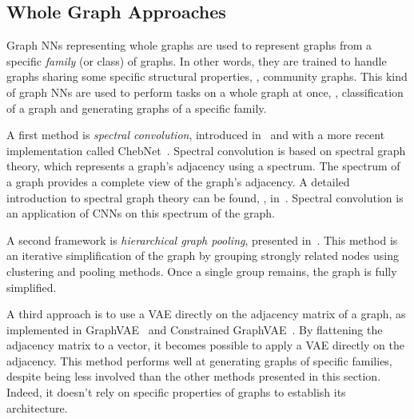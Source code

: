 
\subsection{Whole Graph Approaches\label{sec:soa-graph}}
Graph NNs representing whole graphs are used to represent graphs from a specific \textit{family} (or class) of graphs. In other words, they are trained to handle graphs sharing some specific structural properties, \eg, community graphs.
This kind of graph NNs are used to perform tasks on a whole graph at once, \eg, classification of a graph and generating graphs of a specific family.

A first method is \textit{spectral convolution}, introduced in~\cite{spectral-nn:2014:bruna} and with a more recent implementation called ChebNet~\cite{chebnet:2019:tang}.
Spectral convolution is based on spectral graph theory, which represents a graph's adjacency using a spectrum.
The spectrum of a graph provides a complete view of the graph's adjacency.
A detailed introduction to spectral graph theory can be found, \eg, in~\cite{spectral-graph-lectures:1996:chung}.
Spectral convolution is an application of CNNs on this spectrum of the graph.

A second framework is \textit{hierarchical graph pooling}, presented in~\cite{hierarchical-graph-pooling:2018:ying}.
This method is an iterative simplification of the graph by grouping strongly related nodes using clustering and pooling methods.
Once a single group remains, the graph is fully simplified.

A third approach is to use a VAE directly on the adjacency matrix of a graph, as implemented in GraphVAE~\cite{graph-vae:2016:kipf} and Constrained GraphVAE~\cite{constrained-graph-vae:2018:ma}.
By flattening the adjacency matrix to a vector, it becomes possible to apply a VAE directly on the adjacency.
This method performs well at generating graphs of specific families, despite being less involved than the other methods presented in this section.
Indeed, it doesn't rely on specific properties of graphs to establish its architecture.

